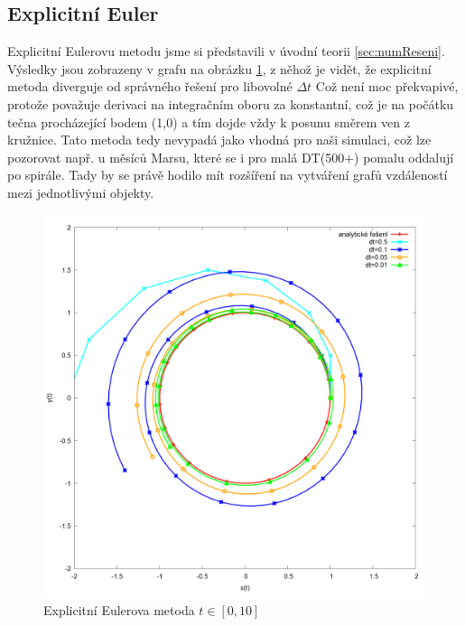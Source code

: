 \subsection{Explicitní Euler}
Explicitní Eulerovu metodu jsme si představili v úvodní teorii \ref{sec:numReseni}. Výsledky jsou zobrazeny v grafu na obrázku \ref{fig:explicitEuler}, z něhož je vidět, že explicitní metoda diverguje od správného řešení pro libovolné $ \Delta t $ Což není moc překvapivé, protože považuje derivaci na integračním oboru za konstantní, což je na počátku tečna procházející bodem (1,0) a tím dojde vždy k posunu směrem ven z kružnice. Tato metoda tedy nevypadá jako vhodná pro naši simulaci, což lze pozorovat např. u měsíců Marsu, které se i pro malá DT(500+) pomalu oddalují po spirále. Tady by se právě hodilo mít rozšíření na vytváření grafů vzdáleností mezi jednotlivými objekty.
\begin{figure}
	\caption{Explicitní Eulerova metoda $ t\in [0,10] $}
	\label{fig:explicitEuler} 
	\centering
	\includegraphics[width=\linewidth]{Figs/explicitEuler}
\end{figure}
